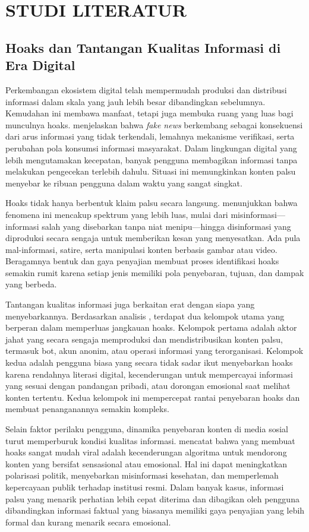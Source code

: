 \chapter{STUDI LITERATUR}
\label{chap:studi-literatur}
\section{Hoaks dan Tantangan Kualitas Informasi di Era Digital}
Perkembangan ekosistem digital telah mempermudah produksi dan distribusi informasi dalam skala yang jauh lebih besar dibandingkan sebelumnya. 
Kemudahan ini membawa manfaat, tetapi juga membuka ruang yang luas bagi munculnya hoaks. 
\textcite{emilremus2025} menjelaskan bahwa \textit{fake news} berkembang sebagai konsekuensi dari arus informasi yang tidak terkendali, 
lemahnya mekanisme verifikasi, serta perubahan pola konsumsi informasi masyarakat. Dalam lingkungan digital yang lebih mengutamakan kecepatan, 
banyak pengguna membagikan informasi tanpa melakukan pengecekan terlebih dahulu. 
Situasi ini memungkinkan konten palsu menyebar ke ribuan pengguna dalam waktu yang sangat singkat.

Hoaks tidak hanya berbentuk klaim palsu secara langsung. \textcite{emilremus2025} menunjukkan bahwa fenomena ini mencakup spektrum yang lebih luas, mulai dari misinformasi—informasi salah yang disebarkan tanpa niat menipu—hingga disinformasi yang diproduksi secara sengaja untuk memberikan kesan yang menyesatkan. Ada pula mal-informasi, satire, serta manipulasi konten berbasis gambar atau video. Beragamnya bentuk dan gaya penyajian membuat proses identifikasi hoaks semakin rumit karena setiap jenis memiliki pola penyebaran, tujuan, dan dampak yang berbeda.

Tantangan kualitas informasi juga berkaitan erat dengan siapa yang menyebarkannya. Berdasarkan analisis \textcite{emilremus2025}, terdapat dua kelompok utama yang berperan dalam memperluas jangkauan hoaks. Kelompok pertama adalah aktor jahat yang secara sengaja memproduksi dan mendistribusikan konten palsu, termasuk bot, akun anonim, atau operasi informasi yang terorganisasi. Kelompok kedua adalah pengguna biasa yang secara tidak sadar ikut menyebarkan hoaks karena rendahnya literasi digital, kecenderungan untuk mempercayai informasi yang sesuai dengan pandangan pribadi, atau dorongan emosional saat melihat konten tertentu. Kedua kelompok ini mempercepat rantai penyebaran hoaks dan membuat penanganannya semakin kompleks.

Selain faktor perilaku pengguna, dinamika penyebaran konten di media sosial turut memperburuk kondisi kualitas informasi. \textcite{alghamdi2024comprehensive} mencatat bahwa yang membuat hoaks sangat mudah viral adalah kecenderungan algoritma untuk mendorong konten yang bersifat sensasional atau emosional. Hal ini dapat meningkatkan polarisasi politik, menyebarkan misinformasi kesehatan, dan memperlemah kepercayaan publik terhadap institusi resmi. Dalam banyak kasus, informasi palsu yang menarik perhatian lebih cepat diterima dan dibagikan oleh pengguna dibandingkan informasi faktual yang biasanya memiliki gaya penyajian yang lebih formal dan kurang menarik secara emosional.

